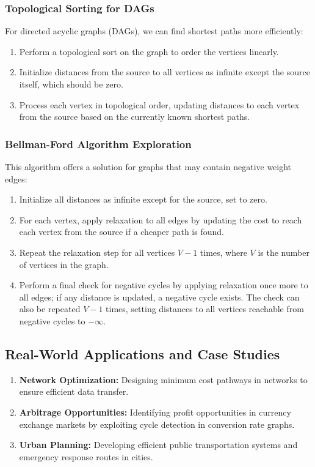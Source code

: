 \documentclass{article}
\begin{document}
\subsubsection{Topological Sorting for DAGs}
For directed acyclic graphs (DAGs), we can find shortest paths more efficiently:
\begin{enumerate}
    \item Perform a topological sort on the graph to order the vertices linearly.
    \item Initialize distances from the source to all vertices as infinite except the source itself, which should be zero.
    \item Process each vertex in topological order, updating distances to each vertex from the source based on the currently known shortest paths.
\end{enumerate}

\subsubsection{Bellman-Ford Algorithm Exploration}
This algorithm offers a solution for graphs that may contain negative weight edges:
\begin{enumerate}
    \item Initialize all distances as infinite except for the source, set to zero.
    \item For each vertex, apply relaxation to all edges by updating the cost to reach each vertex from the source if a cheaper path is found.
    \item Repeat the relaxation step for all vertices $V-1$ times, where $V$ is the number of vertices in the graph.
    \item Perform a final check for negative cycles by applying relaxation once more to all edges; if any distance is updated, a negative cycle exists. The check can also be repeated $V-1$ times, setting distances to all vertices reachable from negative cycles to $-\infty$. 
\end{enumerate}

\subsection{Real-World Applications and Case Studies}
\begin{enumerate}
    \item \textbf{Network Optimization:} Designing minimum cost pathways in networks to ensure efficient data transfer.
    \item \textbf{Arbitrage Opportunities:} Identifying profit opportunities in currency exchange markets by exploiting cycle detection in conversion rate graphs.
    \item \textbf{Urban Planning:} Developing efficient public transportation systems and emergency response routes in cities.
\end{enumerate}
\end{document}
